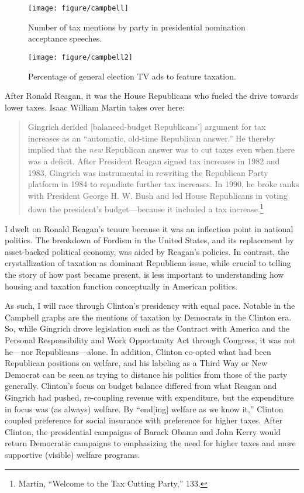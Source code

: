 \documentclass[
]{article}
\let\rmarkdownfootnote\footnote%
\def\footnote{\protect\rmarkdownfootnote}
\begin{document}
\begin{figure}

{\centering \texttt{[image: figure/campbell]}

}

\caption{Number of tax mentions by party in presidential nomination acceptance speeches.}\label{fig:acceptance1}
\end{figure}
\begin{figure}

{\centering \texttt{[image: figure/campbell2]}

}

\caption{Percentage of general election TV ads to feature taxation.}\label{fig:acceptance2}
\end{figure}

After Ronald Reagan, it was the House Republicans who fueled the drive
towards lower taxes. Isaac William Martin takes over here:

\begin{quote}
Gingrich derided {[}balanced-budget Republicans'{]} argument for tax
increases as an ``automatic, old-time Republican answer.'' He thereby
implied that the \emph{new} Republican answer was to cut taxes even when
there was a deficit. After President Reagan signed tax increases in 1982
and 1983, Gingrich was instrumental in rewriting the Republican Party
platform in 1984 to repudiate further tax increases. In 1990, he broke
ranks with President George H. W. Bush and led House Republicans in
voting down the president's budget---because it included a tax
increase.\footnote{Martin, ``Welcome to the Tax Cutting Party,'' 133.}
\end{quote}

I dwelt on Ronald Reagan's tenure because it was an inflection point in
national politics. The breakdown of Fordism in the United States, and
its replacement by asset-backed political economy, was aided by Reagan's
policies. In contrast, the crystallization of taxation as dominant
Republican issue, while crucial to telling the story of how past became
present, is less important to understanding how housing and taxation
function conceptually in American politics.

As such, I will race through Clinton's presidency with equal pace.
Notable in the Campbell graphs are the mentions of taxation by Democrats
in the Clinton era. So, while Gingrich drove legislation such as the
Contract with America and the Personal Responsibility and Work
Opportunity Act through Congress, it was not he---nor
Republicans---alone. In addition, Clinton co-opted what had been
Republican positions on welfare, and his labeling as a Third Way or New
Democrat can be seen as trying to distance his politics from those of
the party generally. Clinton's focus on budget balance differed from
what Reagan and Gingrich had pushed, re-coupling revenue with
expenditure, but the expenditure in focus was (as always) welfare. By
``end{[}ing{]} welfare as we know it,'' Clinton coupled preference for
social insurance with preference for higher taxes. After Clinton, the
presidential campaigns of Barack Obama and John Kerry would return
Democratic campaigns to emphasizing the need for higher taxes and more
supportive (visible) welfare programs.
\end{document}
